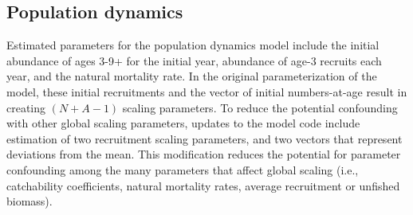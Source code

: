 \documentclass[12pt,letterpaper]{article}
\begin{document}
  \subsection{Population dynamics} %
  \label{sub:population_dynamics}
  Estimated parameters for the population dynamics model include the initial abundance of ages 3-9+ for the initial year, abundance of age-3 recruits each year, and the natural mortality rate. In the original parameterization of the model, these initial recruitments and the vector of initial numbers-at-age result in creating $(N + A-1)$ scaling parameters.  To reduce the potential confounding with other global scaling parameters, updates to the model code include estimation of two recruitment scaling parameters, and two vectors that represent deviations from the mean. This modification reduces the potential for parameter confounding among the many parameters that affect global scaling (i.e., catchability coefficients, natural mortality rates, average recruitment or unfished biomass).

    
  

  
\end{document}
